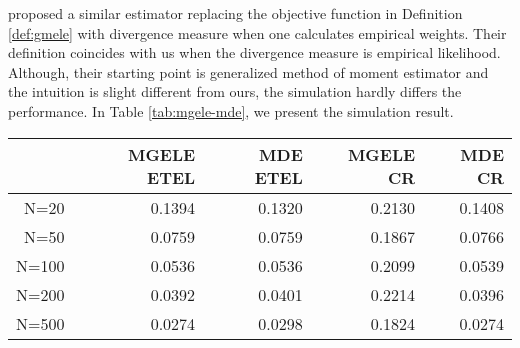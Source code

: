 \citet{newey2004higher} proposed a similar estimator replacing the
objective function in Definition \ref{def:gmele} with divergence
measure when one calculates empirical weights. Their definition coincides
with us when the divergence measure is empirical likelihood. Although,
their starting point is generalized method of moment estimator and
the intuition is slight different from ours, the simulation hardly differs
the performance. In Table \ref{tab:mgele-mde}, we present the simulation
result. 
\begin{table}
\centering
\begin{tabular}{rrrrr}
  \hline
 & MGELE ETEL & MDE ETEL & MGELE CR & MDE CR \\ 
  \hline
N=20 & 0.1394 & 0.1320 & 0.2130 & 0.1408 \\
   N=50 & 0.0759 & 0.0759 & 0.1867 & 0.0766 \\
   N=100 & 0.0536 & 0.0536 & 0.2099 & 0.0539 \\
   N=200 & 0.0392 & 0.0401 & 0.2214 & 0.0396 \\
   N=500 & 0.0274 & 0.0298 & 0.1824 & 0.0274 \\
    \hline
\end{tabular}
\end{table}



